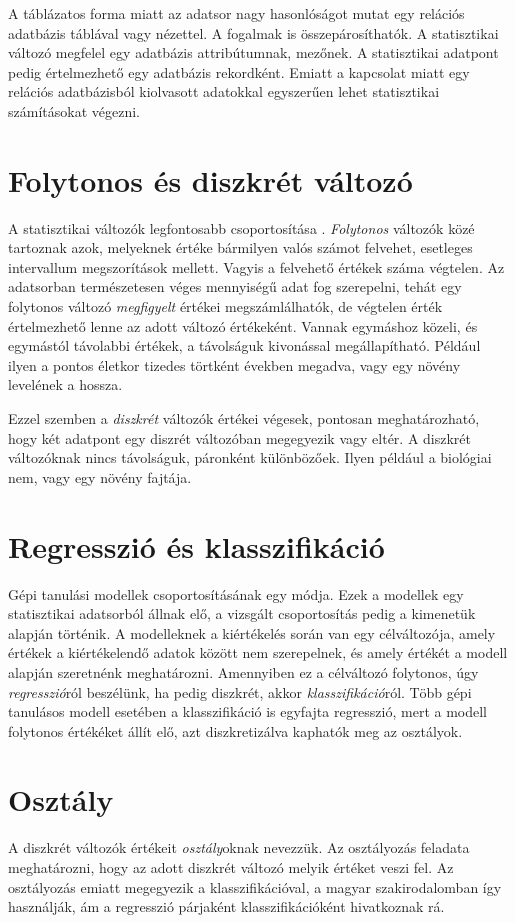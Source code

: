 A táblázatos forma miatt az adatsor nagy hasonlóságot mutat egy relációs adatbázis táblával vagy nézettel. A fogalmak is összepárosíthatók. A statisztikai változó megfelel egy adatbázis attribútumnak, mezőnek. A statisztikai adatpont pedig értelmezhető egy adatbázis rekordként. Emiatt a kapcsolat miatt egy relációs adatbázisból kiolvasott adatokkal egyszerűen lehet statisztikai számításokat végezni.

\section{Folytonos és diszkrét változó}
A statisztikai változók legfontosabb csoportosítása \cite{statokosvaltozok}. \emph{Folytonos} változók közé tartoznak azok, melyeknek értéke bármilyen valós számot felvehet, esetleges intervallum megszorítások mellett. Vagyis a felvehető értékek száma végtelen. Az adatsorban természetesen véges mennyiségű adat fog szerepelni, tehát egy folytonos változó \emph{megfigyelt} értékei megszámlálhatók, de végtelen érték értelmezhető lenne az adott változó értékeként. Vannak egymáshoz közeli, és egymástól távolabbi értékek, a távolságuk kivonással megállapítható. Például ilyen a pontos életkor tizedes törtként években megadva, vagy egy növény levelének a hossza.

Ezzel szemben a \emph{diszkrét} változók értékei végesek, pontosan meghatározható, hogy két adatpont egy diszrét változóban megegyezik vagy eltér. A diszkrét változóknak nincs távolságuk, páronként különbözőek. Ilyen például a biológiai nem, vagy egy növény fajtája.

\section{Regresszió és klasszifikáció}
Gépi tanulási modellek csoportosításának egy módja. Ezek a modellek egy statisztikai adatsorból állnak elő, a vizsgált csoportosítás pedig a kimenetük alapján történik. A modelleknek a kiértékelés során van egy célváltozója, amely értékek a kiértékelendő adatok között nem szerepelnek, és amely értékét a modell alapján szeretnénk meghatározni. Amennyiben ez a célváltozó folytonos, úgy \emph{regresszió}ról beszélünk, ha pedig diszkrét, akkor \emph{klasszifikáció}ról. Több gépi tanulásos modell esetében a klasszifikáció is egyfajta regresszió, mert a modell folytonos értékéket állít elő, azt diszkretizálva kaphatók meg az osztályok.

\section{Osztály}
A diszkrét változók értékeit \emph{osztály}oknak nevezzük. Az osztályozás feladata meghatározni, hogy az adott diszkrét változó melyik értéket veszi fel. Az osztályozás emiatt megegyezik a klasszifikációval, a magyar szakirodalomban így használják, ám a regresszió párjaként klasszifikációként hivatkoznak rá.

